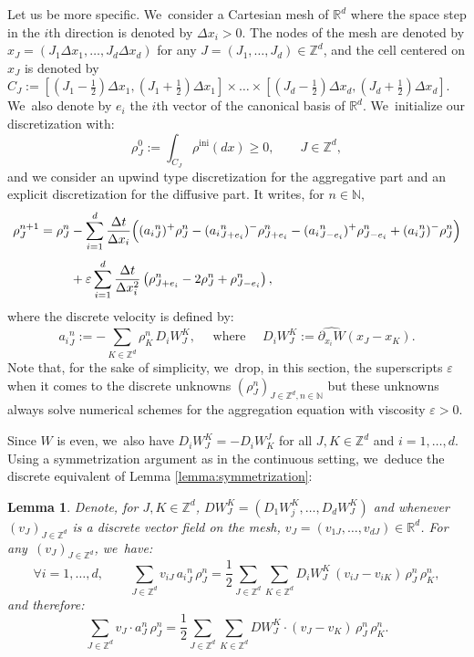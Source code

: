 \documentclass[JEP,XML,SOM,Unicode, NoFloatCountersInSection,published]{cedram}
\newcommand{\ini}{\mathrm{ini}}
\def\NN{\mathbb{N}}
\def\RR{\mathbb{R}}
\def\ZZ{\mathbb{Z}}
\def\eps{\varepsilon}
\def\pa{\partial}
\def\dt{\Delta t}
\def\dx{\Delta x}
\theoremstyle{plain}
\newtheorem{lemma}[theorem]{Lemma}
\theoremstyle{definition}
\begin{document}
Let us be more specific. We~consider a Cartesian mesh of $\RR^d$ where the space step in the $i$th direction is denoted by $\dx_i>0$. The nodes of the mesh are denoted by $x_J = (J_1 \dx_1, \ldots, J_d \dx_d)$ for any $J=(J_1, \ldots, J_d)\in \ZZ^d$, and the cell centered on $x_J$ is denoted by $C_J:=[(J_1-\frac 12)\dx_1,(J_1+\frac 12)\dx_1]\times \ldots \times [(J_d-\frac 12)\dx_d,(J_d+\frac 12)\dx_d]$. We~also denote by $e_i$ the $i$th vector of the canonical basis of $\RR^d$. We~initialize our discretization with:
\begin{equation}\label{dis:rho0}
\rho_{J}^0:= \int_{C_J} \rho^{\ini}(dx)\geq 0, \qquad J \in \ZZ^d,
\end{equation}
and we consider an upwind type discretization for the aggregative part \cite{dlv17, lv17, dlv20} and an explicit discretization for the diffusive part. It writes, for $n \in \NN$,
\begin{align}
\rho_{J}^{n+1} = \rho_{J}^n &- \sum_{i=1}^{d} \frac{\dt}{\dx_i}
\Big(({a_i}^n_{J})^+ \rho_{J}^n - ({a_i}^n_{J+e_i})^- \rho_{J+e_i}^n
-({a_i}^n_{J-e_i})^+ \rho_{J-e_i}^n + ({a_i}^n_{J})^- \rho_{J}^n \Big)\notag \\[-5pt]\label{dis:explicit}
\\[-8pt]
& + \eps \sum_{i=1}^{d} \frac{\dt}{\dx_i^2} \left(\rho_{J+e_i}^n - 2\rho_J^n + \rho_{J-e_i}^n \right),\notag
\end{align}
where the discrete velocity is defined by:
\begin{equation}
\label{def:aij}
{a_i}^n_{J} := -\sum_{K\in \ZZ^d} \rho_{K}^n \,D_iW_J^K,
\quad \mbox{ where } \quad
D_iW_J^K := \widehat{\pa_{x_i} W}(x_J-x_K).
\end{equation}
Note that, for the sake of simplicity, we~drop, in this section, the superscripts $\eps$ when it comes to the discrete unknowns $(\rho_J^n)_{J\in \ZZ^d, n \in \mathbb N}$ but these unknowns always solve numerical schemes for the aggregation equation with viscosity $\eps>0$.

Since $W$ is even, we~also have $D_iW_{J}^{K} = -D_iW^{J}_{K}$ for all $J, K \in \ZZ^d$ and $i =1,\ldots,d$. Using a symmetrization argument as in the continuous setting, we~deduce the discrete equivalent of Lemma \ref{lemma:symmetrization}:
\begin{lemma}\label{lemma:symmetrizationDis}
Denote, for $J, K \in \ZZ^d$, $DW_J^K = (D_1W_j^K, \ldots, D_dW_J^K)$ and whenever $(v_J)_{J \in \ZZ^d}$ is a discrete vector field on the mesh, $v_J = (v_{1J}, \ldots, v_{dJ}) \in \RR^d$. For any~$(v_J)_{J \in \ZZ^d}$, we~have:
\[
\forall i=1, \ldots, d, \qquad \sum_{J\in \ZZ^d} v_{iJ} \, {a_i}^n_{J} \, \rho_{J}^n = \frac 12 \sum_{J\in \ZZ^d} \sum_{K\in \ZZ^d} D_iW_J^K \, (v_{iJ} - v_{iK}) \, \rho_{J}^n \, \rho_{K}^n,
\]
and therefore:
\[
\sum_{J\in \ZZ^d} v_{J} \cdot {a}^n_{J} \, \rho_{J}^n = \frac 12 \sum_{J\in \ZZ^d} \sum_{K\in \ZZ^d} DW_J^K \cdot (v_{J} - v_{K}) \, \rho_{J}^n \, \rho_{K}^n.
\]
\end{lemma}
\end{document}
